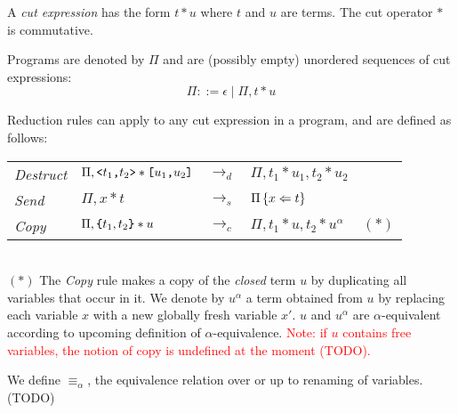 \documentclass{article}
\begin{document}
\newpage


\begin{definition}[Programs]
    A \emph{cut expression} has the form $t * u$ where
    $t$ and $u$ are terms. The cut operator $*$ is commutative.

    Programs are denoted by $\Pi$ and are (possibly empty) unordered sequences of cut expressions:
    \[ \Pi ::= \epsilon \mid \Pi, t * u \]
\end{definition}


\vspace{1em}
\begin{definition}
    Reduction rules can apply to any cut expression in a
    program, and are defined as follows:

\bgroup
\def\arraystretch{1.3}
\begin{tabular}{l l c l l}
   \emph{Destruct} & $\Pi,\mbox{\normalfont\texttt{<}} t_1 \mbox{\normalfont\texttt{,}} t_2\mbox{\normalfont\texttt{>}} * \mbox{\normalfont\texttt{[}}u_1 \mbox{\normalfont\texttt{,}} u_2\mbox{\normalfont\texttt{]}}$ & $\to_d$ & $\Pi, t_1*u_1, t_2*u_2$ \\
   \emph{Send} & $\Pi, x * t$ & $\to_s$ & $\Pi\left\{x \Leftarrow t\right\}$ \\
   \emph{Copy} & $\Pi,\mbox{\normalfont\texttt{\{}}t_1, t_2\mbox{\normalfont\texttt{\}}} * u$ & $\to_c$ & $\Pi, t_1*u, t_2*u^\alpha$ & $(*)$\\
\end{tabular}\egroup\\

\noindent $(*)$ The \emph{Copy} rule makes a copy of the \emph{closed} term $u$ by
duplicating all variables that occur in it.
We denote by $u^\alpha$ a term obtained from $u$ by replacing
each variable $x$ with a new globally fresh variable $x'$. $u$ and $u^\alpha$ are $\alpha$-equivalent according to upcoming
definition of $\alpha$-equivalence.
\textcolor{red}{Note: if $u$ contains free variables, the notion of copy is undefined at the moment (TODO).}

\end{definition}

\begin{definition}
    We define $\equiv_\alpha$, the equivalence relation over \clats{} or \claps{} up to renaming of variables. (TODO)
\end{definition}
\end{document}
